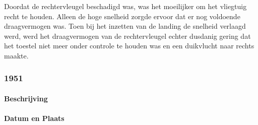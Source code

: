 \documentclass{article}
\begin{document}
	Doordat de rechtervleugel beschadigd was, was het moeilijker om het vliegtuig recht te houden. Alleen de hoge snelheid zorgde ervoor dat er nog voldoende draagvermogen was. Toen bij het inzetten van de landing de snelheid verlaagd werd, werd het draagvermogen van de rechtervleugel echter dusdanig gering dat het toestel niet meer onder controle te houden was en een duikvlucht naar rechts maakte.
	\cite{aviationsafety04101992airplaneCrashBijlmer}
	\cite{catsr25022009Boeing737AmsterdamCrash}
	\cite{BijlmerrampWiki}
	\cite{ElAlFlight1862}
	\cite{bijlmerReconstruction}
	\cite{bijlmer5}
	\cite{dataReconstruct}
	\cite{dataReconstructBijlmermeerairplane1992}
	\cite{dataReconstructBijlmermeerairplane}
	\cite{dataReconstructBijlmermeerairplaneSimul}
	\cite{smailiDataReconstruction}
	\cite{smailiDataReconstructionBijlmer}
	\cite{pilotedSimulator}
	\cite{accidentReport}
	\subsubsection{1951}
			\paragraph{Beschrijving}
	\paragraph{Datum en Plaats}
 
\end{document}
